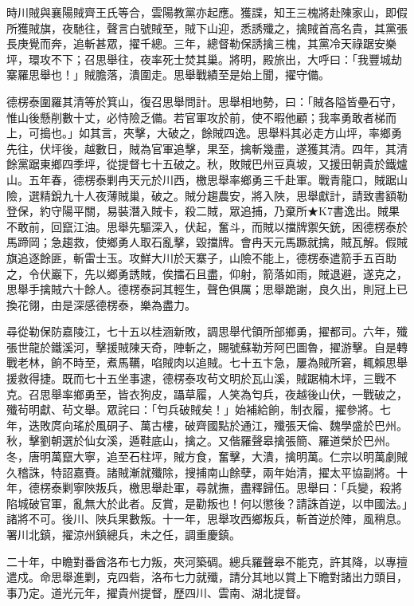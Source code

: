 \begin{pinyinscope}
時川賊與襄陽賊齊王氏等合，雲陽教黨亦起應。獲諜，知王三槐將赴陳家山，即假所獲賊旗，夜馳往，聲言白號賊至，賊下山迎，悉誘殲之，擒賊首高名貴，其黨張長庚覺而奔，追斬甚眾，擢千總。三年，總督勒保誘擒三槐，其黨冷天祿踞安樂坪，環攻不下；召思舉往，夜率死士焚其巢。將明，殿旅出，大呼曰：「我豐城劫寨羅思舉也！」賊膽落，潰圍走。思舉戰績至是始上聞，擢守備。

德楞泰圍羅其清等於箕山，復召思舉問計。思舉相地勢，曰：「賊各隘皆壘石守，惟山後懸削數十丈，必恃險乏備。若官軍攻於前，使不暇他顧；我率勇敢者梯而上，可搗也。」如其言，夾擊，大破之，餘賊四逸。思舉料其必走方山坪，率鄉勇先往，伏坪後，越數日，賊為官軍追擊，果至，擒斬幾盡，遂獲其清。四年，其清餘黨踞東鄉四季坪，從提督七十五破之。秋，敗賊巴州豆真坡，又援田朝貴於鐵爐山。五年春，德楞泰剿冉天元於川西，檄思舉率鄉勇三千赴軍。戰青龍口，賊踞山險，選精銳九十人夜薄賊巢，破之。賊分趨農安，將入陜，思舉獻計，請致書額勒登保，約守陽平關，易裝潛入賊卡，殺二賊，眾追捕，乃棄所★K7書逸出。賊果不敢前，回竄江油。思舉先驅深入，伏起，奮斗，而賊以擋牌禦矢銃，困德楞泰於馬蹄岡；急趨救，使鄉勇人取石亂擊，毀擋牌。會冉天元馬蹶就擒，賊瓦解。假賊旗追逐餘匪，斬雷士玉。攻鮮大川於天寨子，山險不能上，德楞泰遣箭手五百助之，令伏巖下，先以鄉勇誘賊，俟擂石且盡，仰射，箭落如雨，賊退避，遂克之，思舉手擒賊六十餘人。德楞泰訶其輕生，聲色俱厲；思舉跪謝，良久出，則冠上已換花翎，由是深感德楞泰，樂為盡力。

尋從勒保防嘉陵江，七十五以桂涵新敗，調思舉代領所部鄉勇，擢都司。六年，殲張世龍於鐵溪河，擊援賊陳天奇，陣斬之，賜號蘇勒芳阿巴圖魯，擢游擊。自是轉戰老林，餉不時至，煮馬韉，啗賊肉以追賊。七十五卞急，屢為賊所窘，輒賴思舉援救得捷。既而七十五坐事逮，德楞泰攻茍文明於瓦山溪，賊踞楠木坪，三戰不克。召思舉率鄉勇至，皆衣狗皮，躡草履，人笑為匄兵，夜越後山伏，一戰破之，殲茍明獻、茍文舉。眾詫曰：「匄兵破賊矣！」始補給餉，制衣履，擢參將。七年，迭敗庹向瑤於風硐子、萬古樓，破齊國點於通江，殲張天倫、魏學盛於巴州。秋，擊劉朝選於仙女溪，遁鞋底山，擒之。又偕羅聲皋擒張簡、羅道榮於巴州。冬，唐明萬竄大寧，追至石柱坪，賊方食，奮擊，大潰，擒明萬。仁宗以明萬劇賊久稽誅，特詔嘉賚。諸賊漸就殲除，搜捕南山餘孽，兩年始清，擢太平協副將。十年，德楞泰剿寧陜叛兵，檄思舉赴軍，尋就撫，盡釋歸伍。思舉曰：「兵變，殺將陷城破官軍，亂無大於此者。反賞，是勸叛也！何以懲後？請誅首逆，以申國法。」諸將不可。後川、陜兵果數叛。十一年，思舉攻西鄉叛兵，斬首逆於陣，風稍息。署川北鎮，擢涼州鎮總兵，未之任，調重慶鎮。

二十年，中瞻對番酋洛布七力叛，夾河築碉。總兵羅聲皋不能克，許其降，以專擅遣戍。命思舉進剿，克四砦，洛布七力就殲，請分其地以賞上下瞻對諸出力頭目，事乃定。道光元年，擢貴州提督，歷四川、雲南、湖北提督。


\end{pinyinscope}
